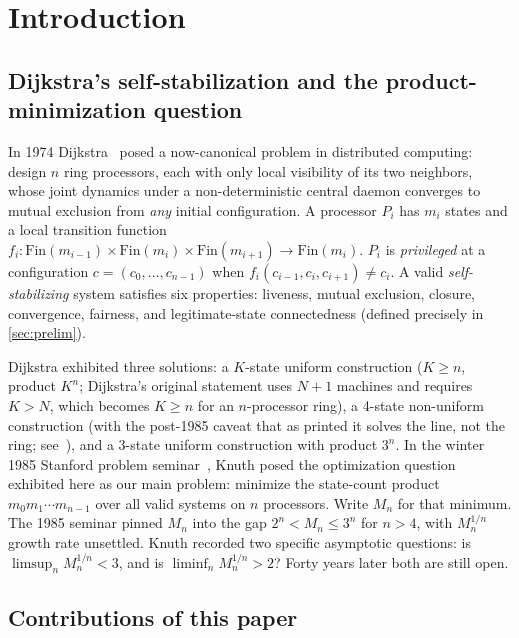 \documentclass[11pt,a4paper]{article}
\theoremstyle{plain}
\theoremstyle{definition}
\newcommand{\Mn}{M_n}
\begin{document}
\section{Introduction}\label{sec:intro}

\subsection{Dijkstra's self-stabilization and the product-minimization question}\label{sec:intro-dijkstra}

In 1974 Dijkstra~\cite{Dijkstra1974} posed a now-canonical problem in
distributed computing: design $n$ ring processors, each with only
local visibility of its two neighbors, whose joint dynamics under a
non-deterministic central daemon converges to mutual exclusion from
\emph{any} initial configuration.  A processor $P_i$ has $m_i$ states
and a local transition function
$f_i : \mathrm{Fin}(m_{i-1}) \times \mathrm{Fin}(m_i) \times \mathrm{Fin}(m_{i+1}) \to \mathrm{Fin}(m_i)$.
$P_i$ is \emph{privileged} at a configuration $c = (c_0, \ldots, c_{n-1})$
when $f_i(c_{i-1}, c_i, c_{i+1}) \ne c_i$.  A valid \emph{self-stabilizing}
system satisfies six properties: liveness, mutual exclusion, closure,
convergence, fairness, and legitimate-state connectedness (defined
precisely in \cref{sec:prelim}).

Dijkstra exhibited three solutions: a $K$-state uniform construction
($K \ge n$, product $K^n$; Dijkstra's original statement uses $N + 1$
machines and requires $K > N$, which becomes $K \ge n$ for an
$n$-processor ring), a 4-state non-uniform construction (with
the post-1985 caveat that as printed it solves the line, not the ring;
see~\cite{HaddadKnuth1985}), and a 3-state uniform construction with
product $3^n$.  In the winter 1985 Stanford problem
seminar~\cite{HaddadKnuth1985}, Knuth posed the optimization question
exhibited here as our main problem: minimize the state-count product
$m_0 m_1 \cdots m_{n-1}$ over all valid systems on $n$ processors.
Write $\Mn$ for that minimum.  The 1985 seminar pinned $\Mn$ into the
gap $2^n < \Mn \le 3^n$ for $n > 4$, with $\Mn^{1/n}$ growth rate
unsettled.  Knuth recorded two specific asymptotic questions: is
$\limsup_n \Mn^{1/n} < 3$, and is $\liminf_n \Mn^{1/n} > 2$?
Forty years later both are still open.

\subsection{Contributions of this paper}\label{sec:intro-contrib}
\end{document}
